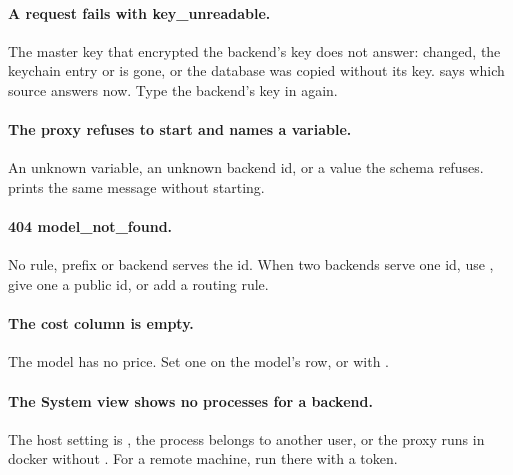 \paragraph{A request fails with key\_unreadable.} The master key that encrypted the backend's key does not answer:  changed, the keychain entry or  is gone, or the database was copied without its key.  says which source answers now. Type the backend's key in again.

\paragraph{The proxy refuses to start and names a variable.} An unknown  variable, an unknown backend id, or a value the schema refuses.  prints the same message without starting.

\paragraph{404 model\_not\_found.} No rule, prefix or backend serves the id. When two backends serve one id, use , give one a public id, or add a routing rule.

\paragraph{The cost column is empty.} The model has no price. Set one on the model's row, or with .

\paragraph{The System view shows no processes for a backend.} The host setting is , the process belongs to another user, or the proxy runs in docker without . For a remote machine, run  there with a token.
